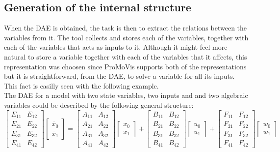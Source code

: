 \subsection{Generation of the internal structure}
When the DAE is obtained, the task is then to extract the relations between the variables from it. The tool collects and stores each of the variables, together with each of the variables that acts as inputs to it. Although it might feel more natural to store a variable together with each of the variables that it affects, this representation was choosen since ProMoVis supports both of the representations but it is straightforward, from the DAE, to solve a variable for all its inputs.\\\newline
This fact is easilly seen with the following example.\\\newline
The DAE for a model with two state variables, two inputs and and two algebraic variables could be described by the following general structure:\\\newline
$\begin{bmatrix} E_{11} & E_{12} \\ E_{21} & E_{22} \\ E_{31} & E_{32} \\ E_{41} & E_{42} \end{bmatrix} \left[ \begin{array}{c} \dot{x_0} \\ \dot{x_1} \end{array} \right] = \begin{bmatrix} A_{11} & A_{12} \\ A_{21} & A_{22} \\ A_{31} & A_{32} \\ A_{41} & A_{42} \end{bmatrix} \left[ \begin{array}{c} x_0 \\ x_1 \end{array} \right] + \begin{bmatrix} B_{11} & B_{12} \\ B_{21} & B_{22} \\ B_{31} & B_{32} \\ B_{41} & B_{42} \end{bmatrix} \left[ \begin{array}{c} u_0 \\ u_1 \end{array} \right]+\begin{bmatrix} F_{11} & F_{12} \\ F_{21} & F_{22} \\ F_{31} & F_{32} \\ F_{41} & F_{42}\end{bmatrix} \left[ \begin{array}{c} w_0 \\ w_1 \end{array} \right]$
